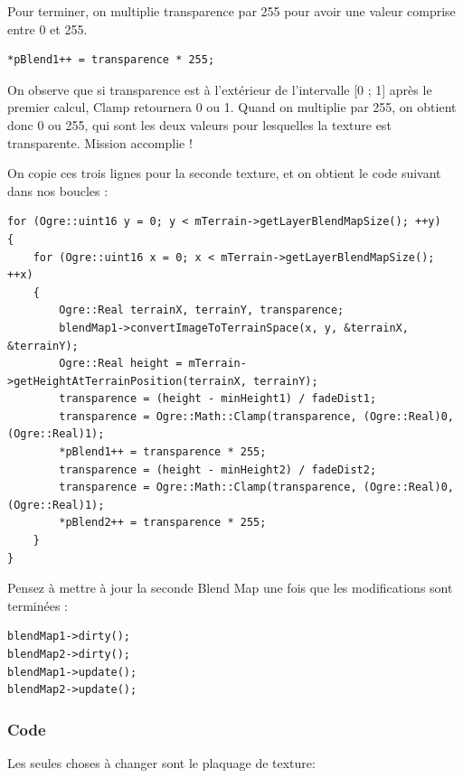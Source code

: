 Pour terminer, on multiplie transparence par 255 pour avoir une valeur comprise entre 0 et 255.

\begin{lstlisting}[caption={}]
*pBlend1++ = transparence * 255;
\end{lstlisting}

On observe que si transparence est à l'extérieur de l'intervalle [0 ; 1] après le premier calcul, Clamp retournera 0 ou 1. Quand on multiplie par 255, on obtient donc 0 ou 255, qui sont les deux valeurs pour lesquelles la texture est transparente. Mission accomplie !

On copie ces trois lignes pour la seconde texture, et on obtient le code suivant dans nos boucles :

\begin{lstlisting}[caption={}]
for (Ogre::uint16 y = 0; y < mTerrain->getLayerBlendMapSize(); ++y)
{
    for (Ogre::uint16 x = 0; x < mTerrain->getLayerBlendMapSize(); ++x)
    {
        Ogre::Real terrainX, terrainY, transparence;
        blendMap1->convertImageToTerrainSpace(x, y, &terrainX, &terrainY);
        Ogre::Real height = mTerrain->getHeightAtTerrainPosition(terrainX, terrainY);
        transparence = (height - minHeight1) / fadeDist1;
        transparence = Ogre::Math::Clamp(transparence, (Ogre::Real)0, (Ogre::Real)1);
        *pBlend1++ = transparence * 255;
        transparence = (height - minHeight2) / fadeDist2;
        transparence = Ogre::Math::Clamp(transparence, (Ogre::Real)0, (Ogre::Real)1);
        *pBlend2++ = transparence * 255;
    }
}
\end{lstlisting}

Pensez à mettre à jour la seconde Blend Map une fois que les modifications sont terminées :

\begin{lstlisting}[caption={}]
blendMap1->dirty();
blendMap2->dirty();
blendMap1->update();
blendMap2->update();
\end{lstlisting}




\subsubsection{Code}
Les seules choses à changer sont le plaquage de texture:



